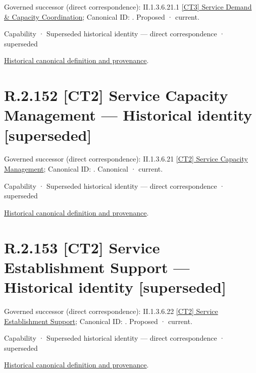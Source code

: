 {\small Governed successor (direct correspondence): II.1.3.6.21.1 \hyperref[element:93b5548ce8d04fcd999b97536c1eebf9]{[CT3] Service Demand \& Capacity Coordination}; Canonical ID: \texttt{}. Proposed · current.}\par
\label{element:b57081e650f74ad488549fdaa5305bcb}
{\small Capability · Superseded historical identity — direct correspondence · superseded}\par
\href{../../../../../../../continuum/strategy/capability/b57081e650f74ad488549fdaa5305bcb.md}{Historical canonical definition and provenance}.\par
\section*{R.2.152 [CT2] Service Capacity Management — Historical identity [superseded]}
\label{navigation:R.2.152}

{\small Governed successor (direct correspondence): II.1.3.6.21 \hyperref[element:d86105bf9c86445394088f65c895d37f]{[CT2] Service Capacity Management}; Canonical ID: \texttt{}. Canonical · current.}\par
\label{element:ac205f374c9d41c3b6d18a6b7c356152}
{\small Capability · Superseded historical identity — direct correspondence · superseded}\par
\href{../../../../../../../continuum/strategy/capability/ac205f374c9d41c3b6d18a6b7c356152.md}{Historical canonical definition and provenance}.\par
\section*{R.2.153 [CT2] Service Establishment Support — Historical identity [superseded]}
\label{navigation:R.2.153}

{\small Governed successor (direct correspondence): II.1.3.6.22 \hyperref[element:20e67a41e7f44398b0f0cf3d379d8b9c]{[CT2] Service Establishment Support}; Canonical ID: \texttt{}. Proposed · current.}\par
\label{element:8a63b08f34fa42c5bda2a3e12b9ecd55}
{\small Capability · Superseded historical identity — direct correspondence · superseded}\par
\href{../../../../../../../continuum/strategy/capability/8a63b08f34fa42c5bda2a3e12b9ecd55.md}{Historical canonical definition and provenance}.\par
